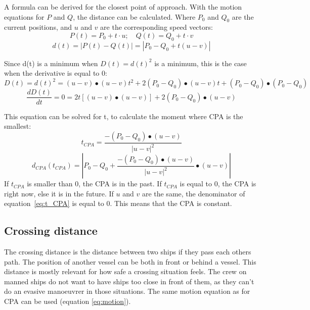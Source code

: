 A formula can be derived for the closest point of approach. With the motion equations for $P$ and $Q$, the distance can be calculated. Where $P_0$ and $Q_0$ are the current positions, and $u$ and $v$ are the corresponding speed vectors:
\begin{equation}
\label{eq:motion}
P(t) = P_0 + t \cdot u ;\quad  Q(t) = Q_0 + t \cdot v
\end{equation}
\begin{equation}
d(t) = |P(t) - Q(t)| = |P_0 - Q_0 + t (u - v)|
\end{equation}

Since d(t) is a minimum when $D(t) = d(t)^2$ is a minimum, this is the case when the derivative is equal to 0:
\begin{equation}
D(t) = d(t)^2 = (u - v) \bullet (u - v) t^2 + 2 (P_0 - Q_0) \bullet (u - v) t + (P_0 - Q_0) \bullet (P_0 - Q_0)
\end{equation}
\begin{equation}
\frac{d D(t)}{dt} = 0 = 2t[(u - v) \bullet (u-v)] + 2 (P_0 - Q_0) \bullet (u - v)
\end{equation}

This equation can be solved for t, to calculate the moment where CPA is the smallest:
\begin{equation}
\label{eq:t_CPA}
t_{CPA} = \frac{-(P_0 - Q_0) \bullet (u - v)}{|u - v|^2}
\end{equation}
\begin{equation}
d_{CPA}(t_{CPA}) = |P_0 - Q_0 + \frac{-(P_0 - Q_0) \bullet (u - v)}{|u - v|^2} \bullet (u - v)|
\end{equation}
If $t_{CPA}$ is smaller than 0, the CPA is in the past. If $t_{CPA}$ is equal to 0, the CPA is right now, else it is in the future. If $u$ and $v$ are the same, the denominator of equation~\ref{eq:t_CPA} is equal to 0. This means that the CPA is constant.

\subsection{Crossing distance}
The crossing distance is the distance between two ships if they pass each others path. The position of another vessel can be both in front or behind a vessel. This distance is mostly relevant for how safe a crossing situation feels. The crew on manned ships do not want to have ships too close in front of them, as they can't do an evasive manoeuvrer in those situations. The same motion equation as for CPA can be used (equation \ref{eq:motion}). 

